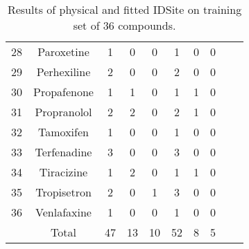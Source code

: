 \begin{table}[h]
\begin{tabular}{cccccccccc}
28 & Paroxetine & 1 & 0 & 0 & 1 & 0 & 0 \\
29 & Perhexiline & 2 & 0 & 0 & 2 & 0 & 0 \\
30 & Propafenone & 1 & 1 & 0 & 1 & 1 & 0 \\
31 & Propranolol & 2 & 2 & 0 & 2 & 1 & 0 \\
32 & Tamoxifen & 1 & 0 & 0 & 1 & 0 & 0 \\
33 & Terfenadine & 3 & 0 & 0 & 3 & 0 & 0 \\
34 & Tiracizine & 1 & 2 & 0 & 1 & 1 & 0 \\
35 & Tropisetron & 2 & 0 & 1 & 3 & 0 & 0 \\
36 & Venlafaxine & 1 & 0 & 0 & 1 & 0 & 0 \\
 & Total & 47 & 13 & 10 & 52 & 8 & 5 \\
\hline
\end{tabular}
\caption{Results of physical and fitted IDSite on training set of 36 compounds.}
\label{table:p450_training}
\end{table}
